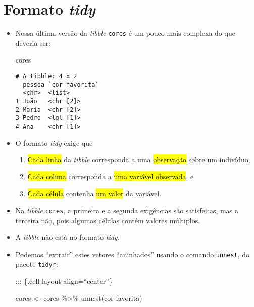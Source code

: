 \documentclass[
  letterpaper,
  DIV=11,
  numbers=noendperiod]{scrreprt}
\newenvironment{Shaded}{\begin{snugshade}}{\end{snugshade}}
\newcommand{\AttributeTok}[1]{\textcolor[rgb]{0.40,0.45,0.13}{#1}}
\newcommand{\FunctionTok}[1]{\textcolor[rgb]{0.28,0.35,0.67}{#1}}
\newcommand{\NormalTok}[1]{\textcolor[rgb]{0.00,0.23,0.31}{#1}}
\newcommand{\OtherTok}[1]{\textcolor[rgb]{0.00,0.23,0.31}{#1}}
\newcommand{\SpecialCharTok}[1]{\textcolor[rgb]{0.37,0.37,0.37}{#1}}
\newcommand{\StringTok}[1]{\textcolor[rgb]{0.13,0.47,0.30}{#1}}
\begin{document}
\section{\texorpdfstring{Formato
\emph{tidy}}{Formato tidy}}\label{formato-tidy}

\begin{itemize}
\item
  Nossa última versão da \emph{tibble} \texttt{cores} é um pouco mais
  complexa do que deveria ser:

\begin{Shaded}
\begin{Highlighting}[]
\NormalTok{cores}
\end{Highlighting}
\end{Shaded}

\begin{verbatim}
# A tibble: 4 x 2
  pessoa `cor favorita`
  <chr>  <list>        
1 João   <chr [2]>     
2 Maria  <chr [2]>     
3 Pedro  <lgl [1]>     
4 Ana    <chr [1]>     
\end{verbatim}
\item
  O formato \emph{tidy} exige que

  \begin{enumerate}
  \def\labelenumi{\arabic{enumi}.}
  \item
    {\hl{Cada linha}} da \emph{tibble} corresponda a uma
    {\hl{observação}} sobre um indivíduo,
  \item
    {\hl{Cada coluna}} corresponda a {\hl{uma variável observada}}, e
  \item
    {\hl{Cada célula}} contenha {\hl{um valor}} da variável.
  \end{enumerate}
\item
  Na \emph{tibble} \texttt{cores}, a primeira e a segunda exigências são
  satisfeitas, mas a terceira não, pois algumas células contém valores
  múltiplos.
\item
  A \emph{tibble} não está no formato \emph{tidy}.
\item
  Podemos ``extrair'' estes vetores ``aninhados'' usando o comando
  \texttt{unnest}, do pacote \texttt{tidyr}:

  ::: \{.cell layout-align=``center''\}

\begin{Shaded}
\begin{Highlighting}[]
\NormalTok{cores }\OtherTok{\textless{}{-}}\NormalTok{ cores }\SpecialCharTok{\%\textgreater{}\%} 
  \FunctionTok{unnest}\NormalTok{(}\StringTok{\textasciigrave{}}\AttributeTok{cor favorita}\StringTok{\textasciigrave{}}\NormalTok{)}
\end{Highlighting}
\end{Shaded}


\end{itemize}
\end{document}
